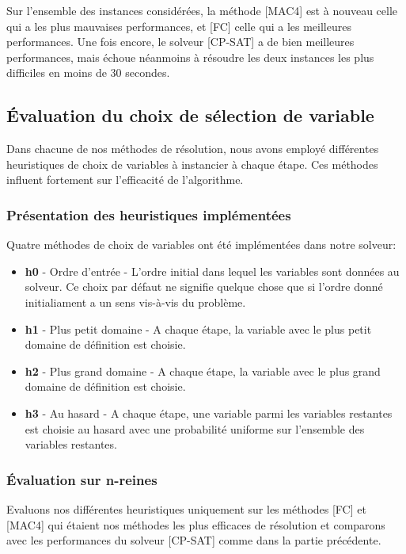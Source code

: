\documentclass[14pt]{article}
\begin{document}
Sur l'ensemble des instances considérées, la méthode [MAC4] est à nouveau celle qui a les plus mauvaises performances, et [FC] celle qui a les meilleures performances. Une fois encore, le solveur [CP-SAT] a de bien meilleures performances, mais échoue néanmoins à résoudre les deux instances les plus difficiles en moins de 30 secondes.

\subsection{Évaluation du choix de sélection de variable}

Dans chacune de nos méthodes de résolution, nous avons employé différentes heuristiques de choix de variables à instancier à chaque étape. Ces méthodes influent fortement sur l'efficacité de l'algorithme.

\subsubsection{Présentation des heuristiques implémentées}

Quatre méthodes de choix de variables ont été implémentées dans notre solveur:
\begin{itemize}
	\item \textbf{h0} - Ordre d'entrée - L'ordre initial dans lequel les variables sont données au solveur. Ce choix par défaut ne signifie quelque chose que si l'ordre donné initialiament a un sens vis-à-vis du problème.
	\item \textbf{h1} - Plus petit domaine - A chaque étape, la variable avec le plus petit domaine de définition est choisie.
	\item \textbf{h2} - Plus grand domaine - A chaque étape, la variable avec le plus grand domaine de définition est choisie.
	\item \textbf{h3} - Au hasard - A chaque étape, une variable parmi les variables restantes est choisie au hasard avec une probabilité uniforme sur l'ensemble des variables restantes.
\end{itemize}


\subsubsection{Évaluation sur n-reines}

Evaluons nos différentes heuristiques uniquement sur les méthodes [FC] et [MAC4] qui étaient nos méthodes les plus efficaces de résolution et comparons avec les performances du solveur [CP-SAT] comme dans la partie précédente.
\end{document}
